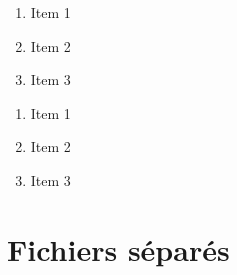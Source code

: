 \documentclass{article}
\begin{document}
\begin{multicols*}{3}
\begin{minipage}[c]{0.3\linewidth}
    \begin{enumerate}
        \item Item 1
        \item Item 2
        \item Item 3
    \end{enumerate}
\end{minipage}
\begin{minipage}[c]{0.6\linewidth}
    \begin{latexcode}
        \begin{enumerate}
            \item Item 1
            \item Item 2
            \item Item 3 \label{it:item3}
        \end{enumerate}
    \end{latexcode}
\end{minipage}
\begin{latexcode}
    \usepackage{enumitem}
\end{latexcode}

\section*{Fichiers séparés}
\begin{latexcode}
\end{latexcode}


\end{multicols*}
\end{document}
